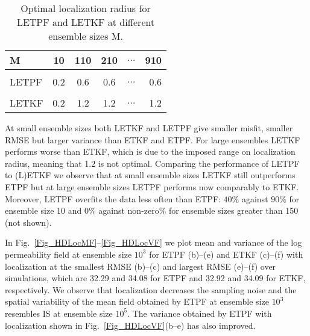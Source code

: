 \documentclass[12, a4paper]{article}
\numberwithin{equation}{section}
\begin{document}
\begin{table}[t]
		\centering
	\begin{center}
	\caption{Optimal localization radius for LETPF and LETKF at different ensemble sizes M.\label{Tab_rho}}
	\begin{tabular}{lccccr}
		
        \hline 
		M & 10  &  110  &  210  &  $\hdots$ & 910 \\
        \hline \\
		LETPF & 0.2  &  0.6    &   0.6  &  $\hdots$ & 0.6\\
		\\
		LETKF & 0.2  &  1.2    &   1.2  &  $\hdots$ & 1.2\\
         \hline
	\end{tabular}
	\end{center}
\end{table}
% 
At small ensemble sizes both LETKF and LETPF give smaller misfit, smaller RMSE but larger variance than ETKF and ETPF.
For large ensembles LETKF performs worse than ETKF, which is due to the imposed range 
on localization radius, meaning that 1.2 is not optimal.  
Comparing the performance of LETPF to (L)ETKF we observe 
that at small ensemble sizes LETKF still outperforms ETPF
but at large ensemble sizes LETPF performs now comparably to ETKF. 
Moreover, LETPF overfits the data less often than ETPF: $40\%$ against $90\%$ for ensemble size 10 
and $0\%$ against non-zero$\%$ for ensemble sizes greater than 150 (not shown). 

In Fig.~\ref{Fig_HDLocMF}--\ref{Fig_HDLocVF} we plot mean and variance of the log permeability field at ensemble size $10^3$ for ETPF (b)--(e) and ETKF (c)--(f) with localization at the smallest RMSE (b)--(c) and largest RMSE (e)--(f) over simulations, which are 32.29 and 34.08 for ETPF and 32.92 and 34.09 for ETKF, respectively. We observe that localization decreases the sampling noise and the spatial variability of the mean field obtained by ETPF at ensemble size $10^3$ resembles IS at ensemble size $10^5$. The variance obtained by ETPF with localization shown in Fig.~\ref{Fig_HDLocVF}(b--e) has also improved. 
\end{document}
